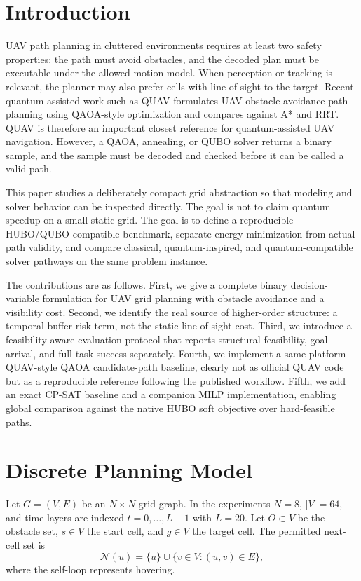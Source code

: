 \documentclass[10pt,conference]{IEEEtran}
\begin{document}
\section{Introduction}
UAV path planning in cluttered environments requires at least two safety properties: the path must avoid obstacles, and the decoded plan must be executable under the allowed motion model. When perception or tracking is relevant, the planner may also prefer cells with line of sight to the target. Recent quantum-assisted work such as QUAV formulates UAV obstacle-avoidance path planning using QAOA-style optimization and compares against A* and RRT. QUAV is therefore an important closest reference for quantum-assisted UAV navigation. However, a QAOA, annealing, or QUBO solver returns a binary sample, and the sample must be decoded and checked before it can be called a valid path.

This paper studies a deliberately compact grid abstraction so that modeling and solver behavior can be inspected directly. The goal is not to claim quantum speedup on a small static grid. The goal is to define a reproducible HUBO/QUBO-compatible benchmark, separate energy minimization from actual path validity, and compare classical, quantum-inspired, and quantum-compatible solver pathways on the same problem instance.

The contributions are as follows. First, we give a complete binary decision-variable formulation for UAV grid planning with obstacle avoidance and a visibility cost. Second, we identify the real source of higher-order structure: a temporal buffer-risk term, not the static line-of-sight cost. Third, we introduce a feasibility-aware evaluation protocol that reports structural feasibility, goal arrival, and full-task success separately. Fourth, we implement a same-platform QUAV-style QAOA candidate-path baseline, clearly not as official QUAV code but as a reproducible reference following the published workflow. Fifth, we add an exact CP-SAT baseline and a companion MILP implementation, enabling global comparison against the native HUBO soft objective over hard-feasible paths.

\section{Discrete Planning Model}
Let $G=(V,E)$ be an $N\times N$ grid graph. In the experiments $N=8$, $|V|=64$, and time layers are indexed $t=0,\ldots,L-1$ with $L=20$. Let $O\subset V$ be the obstacle set, $s\in V$ the start cell, and $g\in V$ the target cell. The permitted next-cell set is
\begin{equation}
\mathcal{N}(u)=\{u\}\cup\{v\in V:(u,v)\in E\},
\end{equation}
where the self-loop represents hovering.
\end{document}
